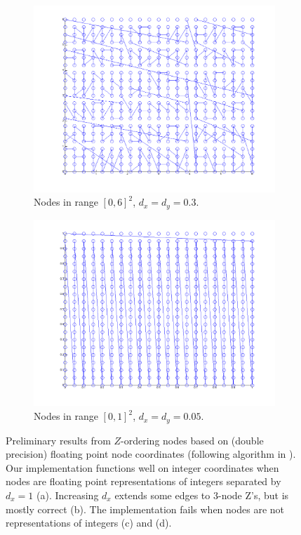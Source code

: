 \documentclass{report}
\begin{document}
\begin{figure}
\begin{subfigure}[t]{0.5\textwidth}
\includegraphics[width=\textwidth]{stencils_content/scale3em1.png}
\caption{Nodes in range $[0,6]^2$, $d_x = d_y = 0.3$.  }
\label{fig:connor_fails}
\end{subfigure}
\begin{subfigure}[t]{0.5\textwidth}
\includegraphics[width=\textwidth]{stencils_content/range0_1.png}
\caption{Nodes in range $[0,1]^2$, $d_x = d_y = 0.05$. }
\label{fig:connor_fails2}
\end{subfigure}
\caption{Preliminary results from $Z$-ordering nodes based on  (double precision) floating point node coordinates (following algorithm in \cite{Connor2009}). Our implementation functions well on integer coordinates when nodes are floating point representations of integers separated by $d_x = 1$ (a). Increasing $d_x$ extends some edges to 3-node Z's, but is mostly correct (b). The implementation fails when nodes are not representations of integers (c) and (d).}
\label{fig:float_z_results}
\end{figure}


\ifstandalone


\end{document}
